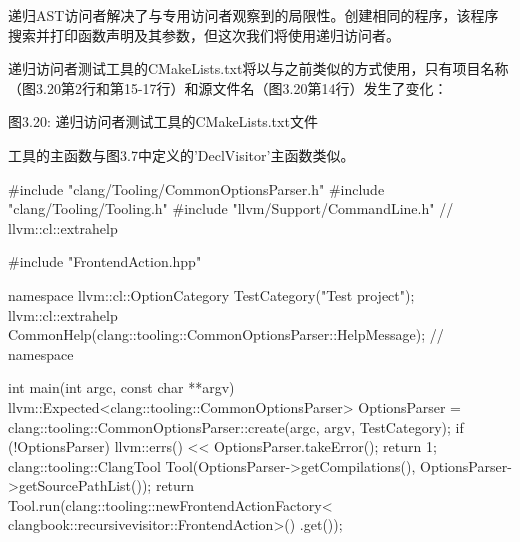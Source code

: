 递归AST访问者解决了与专用访问者观察到的局限性。创建相同的程序，该程序搜索并打印函数声明及其参数，但这次我们将使用递归访问者。

递归访问者测试工具的CMakeLists.txt将以与之前类似的方式使用，只有项目名称（图3.20第2行和第15-17行）和源文件名（图3.20第14行）发生了变化：


\begin{center}
图3.20: 递归访问者测试工具的CMakeLists.txt文件
\end{center}

工具的主函数与图3.7中定义的'DeclVisitor'主函数类似。

\begin{cpp}
#include "clang/Tooling/CommonOptionsParser.h"
#include "clang/Tooling/Tooling.h"
#include "llvm/Support/CommandLine.h" // llvm::cl::extrahelp

#include "FrontendAction.hpp"

namespace {
llvm::cl::OptionCategory TestCategory("Test project");
llvm::cl::extrahelp
  CommonHelp(clang::tooling::CommonOptionsParser::HelpMessage);
} // namespace

int main(int argc, const char **argv) {
  llvm::Expected<clang::tooling::CommonOptionsParser> OptionsParser =
    clang::tooling::CommonOptionsParser::create(argc, argv, TestCategory);
  if (!OptionsParser) {
    llvm::errs() << OptionsParser.takeError();
    return 1;
  }
  clang::tooling::ClangTool Tool(OptionsParser->getCompilations(),
                                 OptionsParser->getSourcePathList());
  return Tool.run(clang::tooling::newFrontendActionFactory<
                    clangbook::recursivevisitor::FrontendAction>()
                    .get());
}
\end{cpp}

